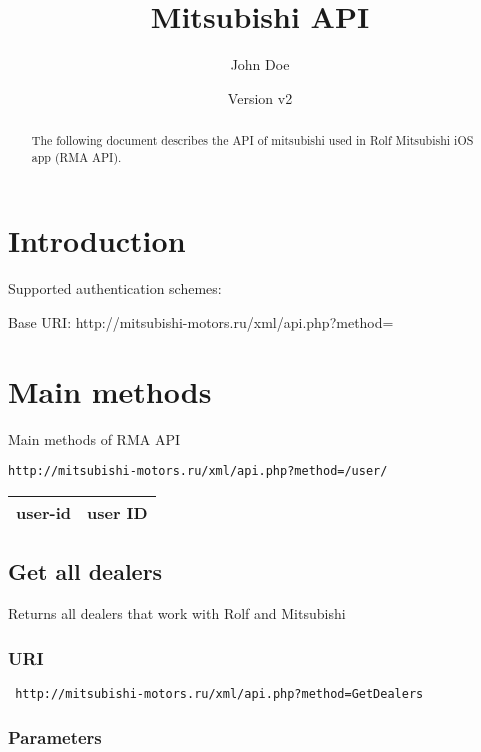 \documentclass[a4paper,9pt]{extarticle}
\title{Mitsubishi API}
\author{John Doe}
\date{Version v2}
\begin{document}
\maketitle

\begin{abstract}
		The following document describes the API of mitsubishi used in Rolf Mitsubishi iOS app (RMA API). 
\end{abstract}


\tableofcontents

\section*{Introduction}
	Supported authentication schemes:
		
				\begin{itemize}
				
				\end{itemize}
	
	Base URI:
		http://mitsubishi-motors.ru/xml/api.php?method=
		
		\section{Main methods}
		
		Main methods of RMA API 
		
		\texttt{http://mitsubishi-motors.ru/xml/api.php?method=/user/}

		\begin{tabular}{|l|l|}\hline
		\textbf{user-id} & user ID \\
									\hline
							\end{tabular}     			        
   			        
		
		\subsection{Get all dealers}
		Returns all dealers that work with Rolf and Mitsubishi
		\subsubsection*{URI}
					 
			\texttt{
			http://mitsubishi-motors.ru/xml/api.php?method=GetDealers}		
		\subsubsection*{Parameters}
		\begin{tabular}{|l|l|}\hline
		\end{tabular}  
		
\end{document}
